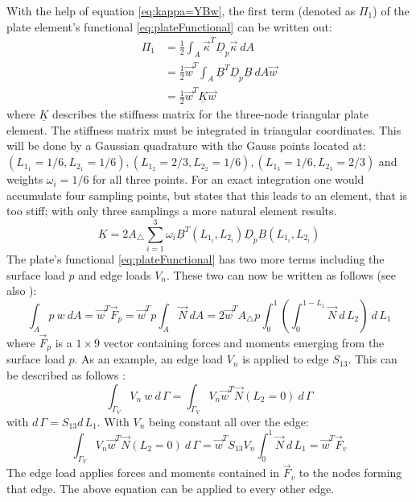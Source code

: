  With the help of equation \eqref{eq:kappa=YBw}, the first term (denoted as $\Pi_1$) of the plate element's functional \eqref{eq:plateFunctional} can be written out:
  \begin{align}\label{eq:t3_pi1=0.5wTKw}
  \Pi_1 &= \frac{1}{2} \int_A \vec{\kappa}^T \underline{D}_p \vec{\kappa}\ d\!A \nonumber\\
        &= \frac{1}{2} \vec{w}^T \int_A \underline{B}^T \underline{D}_p \underline{B}\ d\!A \vec{w} \nonumber\\
        &= \frac{1}{2} \vec{w}^T \underline{K} \vec{w}
  \end{align}
  where $\underline{K}$ describes the stiffness matrix for the three-node triangular plate element. The stiffness matrix must be integrated in triangular coordinates. This will be done by a Gaussian quadrature with the Gauss points located at: $(L_{1_1} = 1/6, L_{2_1} = 1/6), (L_{1_2} = 2/3, L_{2_2} = 1/6), (L_{1_3} = 1/6, L_{2_3} = 2/3)$ and weights $\omega_i = 1/6$ for all three points. For an exact integration one would accumulate four sampling points, but \cite{steinke2005finite} states that this leads to an element, that is too stiff; with only three samplings a more natural element results.
  \begin{equation}
  \underline{K} = 2 A_\triangle \sum_{i=1}^{3} \omega_i \underline{B}^T(L_{1_i}, L_{2_i}) \underline{D}_p \underline{B}(L_{1_i}, L_{2_i})
  \end{equation}
  The plate's functional \eqref{eq:plateFunctional} has two more terms including the surface load $p$ and edge loads $V_n$. These two can now be written as follows (see also \cite{steinke2005finite}):
  \begin{equation}
  \int_A p\ w\ d\!A = \vec{w}^T \vec{F}_p = \vec{w}^T p \int_A \vec{N}\ d\!A = 2 \vec{w}^T A_\triangle p \int_{0}^{1}\left(\int_{0}^{1-L_1} \vec{N}\ d\,\!L_2\right)\ d\,\!L_1
  \end{equation}
  where $\vec{F}_p$ is a $1\!\times\!9$ vector containing forces and moments emerging from the surface load $p$.
  As an example, an edge load $V_n$ is applied to edge $S_{13}$. This can be described as follows \cite{steinke2005finite}:
  \begin{equation}
  \int_{\Gamma_V} V_n\:w\ d\,\!\Gamma = \int_{\Gamma_V} V_n \vec{w}^T \vec{N}(L_2 = 0)\ d\,\!\Gamma
  \end{equation}
  with $d\,\!\Gamma = S_{13} d\,\!L_1$. With $V_n$ being constant all over the edge:
  \begin{equation}
  \int_{\Gamma_V} V_n \vec{w}^T \vec{N}(L_2 = 0)\ d\,\!\Gamma = \vec{w}^T S_{13} V_n \int_{0}^{1} \vec{N}\ d\,\!L_1 = \vec{w}^T \vec{F}_v
  \end{equation}
  The edge load applies forces and moments contained in $\vec{F}_v$ to the nodes forming that edge. The above equation can be applied to every other edge.
  
